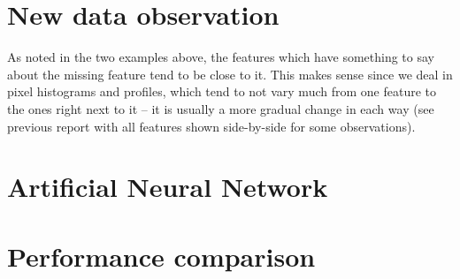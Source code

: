 \section{New data observation}
As noted in the two examples above, the features which have something to say about the missing feature tend to be close to it. This makes sense since we deal in pixel histograms and profiles, which tend to not vary much from one feature to the ones right next to it -- it is usually a more gradual change in each way (see previous report with all features shown side-by-side for some observations).


\section{Artificial Neural Network}


\section{Performance comparison}
